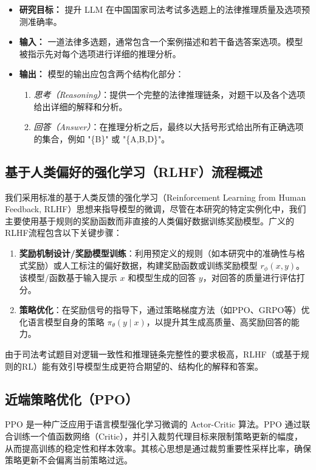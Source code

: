 \documentclass{pkuthesis}
\begin{document}
\begin{itemize}
  \item \textbf{研究目标：}
    提升 LLM 在中国国家司法考试多选题上的法律推理质量及选项预测准确率。
  \item \textbf{输入：}
    一道法律多选题，通常包含一个案例描述和若干备选答案选项。模型被指示先对每个选项进行详细的推理分析。
  \item \textbf{输出：}
    模型的输出应包含两个结构化部分：
    \begin{enumerate}
      \item \emph{思考（Reasoning）}：提供一个完整的法律推理链条，对题干以及各个选项给出详细的解释和分析。
      \item \emph{回答（Answer）}：在推理分析之后，最终以大括号形式给出所有正确选项的集合，例如 "\{B\}" 或 "\{A,B,D\}"。
    \end{enumerate}
\end{itemize}

\subsection{基于人类偏好的强化学习（RLHF）流程概述}
我们采用标准的基于人类反馈的强化学习（Reinforcement Learning from Human Feedback, RLHF）思想来指导模型的微调，尽管在本研究的特定实例化中，我们主要使用基于规则的奖励函数而非直接的人类偏好数据训练奖励模型。广义的RLHF流程包含以下关键步骤：
\begin{enumerate}
    \item \textbf{奖励机制设计/奖励模型训练}：利用预定义的规则（如本研究中的准确性与格式奖励）或人工标注的偏好数据，构建奖励函数或训练奖励模型 $r_{\phi}(x, y)$。该模型/函数基于输入提示 $x$ 和模型生成的回答 $y$，对回答的质量进行评估打分。
    \item \textbf{策略优化}：在奖励信号的指导下，通过策略梯度方法（如PPO、GRPO等）优化语言模型自身的策略 $\pi_{\theta}(y \mid x)$，以提升其生成高质量、高奖励回答的能力。
\end{enumerate}
由于司法考试题目对逻辑一致性和推理链条完整性的要求极高，RLHF（或基于规则的RL）能有效引导模型生成更符合期望的、结构化的解释和答案。

\subsection{近端策略优化（PPO）}
PPO \cite{schulman2017proximal}是一种广泛应用于语言模型强化学习微调的 Actor-Critic 算法。PPO 通过联合训练一个值函数网络（Critic），并引入裁剪代理目标来限制策略更新的幅度，从而提高训练的稳定性和样本效率。其核心思想是通过裁剪重要性采样比率，确保策略更新不会偏离当前策略过远。
\end{document}
